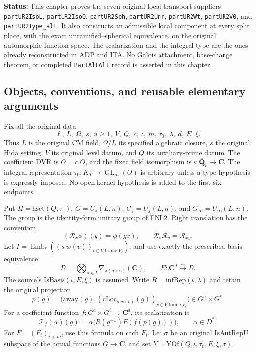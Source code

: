 \documentclass[11pt,a4paper]{article}
\numberwithin{equation}{section}
\theoremstyle{remark}\newtheorem{remark}[theorem]{Remark}
\newcommand{\status}[1]{\textbf{Status:} #1}
\begin{document}
\status{This chapter proves the seven original local-transport
suppliers \texttt{part\allowbreak UR2Iso\allowbreak L}, \texttt{part\allowbreak UR2Iso\allowbreak Q},
\texttt{part\allowbreak UR2Sph}, \texttt{part\allowbreak UR2Unr}, \texttt{part\allowbreak UR2Wt},
\texttt{part\allowbreak UR2V0}, and \texttt{part\allowbreak UR2Type\_\allowbreak alt}.  It also constructs
an admissible local component at every split place, with the exact
unramified--spherical equivalence, on the original automorphic
function space.  The scalarization and the integral type are the
ones already reconstructed in ADP and ITA.  No Galois attachment,
base-change theorem, or completed \texttt{Part\allowbreak Alt\allowbreak Alt} record is
asserted in this chapter.}

\subsection{Objects, conventions, and reusable elementary arguments}

Fix all the original data
\[
 \ell,\ L,\ \Omega,\ s,\ n\ge1,\ V,\ Q,\ c,\ \iota,\ m,\ \tau_0,\
       \lambda,\ d,\ E,\ \xi.
\]
Thus \(L\) is the original CM field, \(\Omega/L\) its specified
algebraic closure, \(s\) the original Hida setting, \(V\) its original
level datum, and \(Q\) its auxiliary-prime datum.  The coefficient DVR
is \(O=c.O\), and the fixed field isomorphism is
\(\iota:\overline{\mathbf Q}_\ell\longrightarrow\mathbf C\).
The integral representation
\(\tau_0:K_T\longrightarrow\operatorname{GL}_m(O)\) is arbitrary
unless a type hypothesis is expressly imposed.  No open-kernel
hypothesis is added to the first six endpoints.

Put \(H=\mathrm{hset}(Q,\tau_0)\),
\(G=U_{\mathbb A}(L,n)\), \(G_f=U_f(L,n)\), and
\(G_\infty=U_\infty(L,n)\).  The group is the identity-form unitary
group of FNL2.  Right translation has the convention
\[
              (\mathscr R_x\phi)(g)=\phi(gx),
              \qquad \mathscr R_x\mathscr R_y=\mathscr R_{xy}.
\]
Let \(I=\operatorname{Emb}_\ell((s.w(v))_{v\in V.\mathrm{frame}.V_\ell})\),
and use exactly the prescribed basis equivalence
\[
 D=\bigotimes_{a\in I}\nabla_{\lambda(a.\mathrm{res})}(\mathbf C),
       \qquad E:\mathbf C^d\xrightarrow{\sim}D .
\]
The source's \(\mathrm{IsBasis}(\iota,E,\xi)\) is assumed.  Write
\(R=\mathrm{infRep}(\iota,\lambda)\) and retain the original projection
\[
 p(g)=\bigl(\mathrm{away}(g),
                 (\mathrm{cLoc}_{s.w(v)}(g))_{v\in V.\mathrm{frame}.V_\ell}\bigr)
             \in G^a\times G^\ell .
\]
For a coefficient function \(f:G^a\times G^\ell\to\mathbf C^d\),
its scalarization is
\begin{equation}\label{eq:ltp-scalarization}
       \mathcal T_f(\alpha)(g)
       =\alpha\bigl(R(g^{-1})E(f(p(g)))\bigr),
                   \qquad\alpha\in D^* .
\end{equation}
For \(F=(F_i)_{i<m}\), use this formula on each \(F_i\).
Let \(\sigma\) be an original \(\mathrm{IsAutRepU}\) subspace of
the actual functions \(G\to\mathbf C\), and set
\(Y=\mathrm{YOf}(Q,\iota,\tau_0,E,\xi,\sigma)\).
\end{document}
